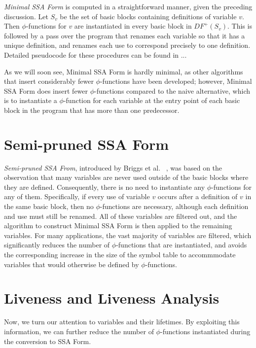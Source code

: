 \emph{Minimal SSA Form} is computed in a straightforward manner,
given the preceding discussion. Let $S_{v}$ be the set of
basic blocks containing definitions of variable $v$. Then
$\phi$-functions for $v$ are instantiated in every basic
block in $DF^{+}(S_{v})$. This is followed by a pass over
the program that renames each variable so that it has a
unique definition, and renames each use to correspond
precisely to one definition. Detailed pseudocode for these
procedures can be found in ... 

As we will soon see, Minimal SSA Form is hardly minimal, as
other algorithms that insert considerably fewer $\phi$-functions
have been developed; however, Minimal SSA Form does insert
fewer $\phi$-functions compared to the naive alternative,
which is to instantiate a $\phi$-function for each variable
at the entry point of each basic block in the program that
has more than one predecessor. 

\section{Semi-pruned SSA Form}

\emph{Semi-pruned SSA From}, introduced by Briggs et al.
~\cite{BriggsJul98}, was based on the observation that
many variables are never used outside of the basic blocks
where they are defined. Consequently, there is no need 
to instantiate any $\phi$-functions for any of them. 
Specifically, if every use of variable $v$ occurs after
a definition of $v$ in the same basic block, then no
$\phi$-functions are necessary, although each definition
and use must still be renamed. All of these variables
are filtered out, and the algorithm to construct
Minimal SSA Form is then applied to the remaining 
variables. For many applications, the vast majority 
of variables are filtered, which significantly reduces
the number of $\phi$-functions that are instantiated,
and avoids the corresponding increase in the size of the
symbol table to accommmodate variables that would otherwise
be defined by $\phi$-functions. 

\section{Liveness and Liveness Analysis}

Now, we turn our attention to variables and their lifetimes. By
exploiting this information, we can further reduce the 
number of $\phi$-functions instantiated during the conversion
to SSA Form. 

